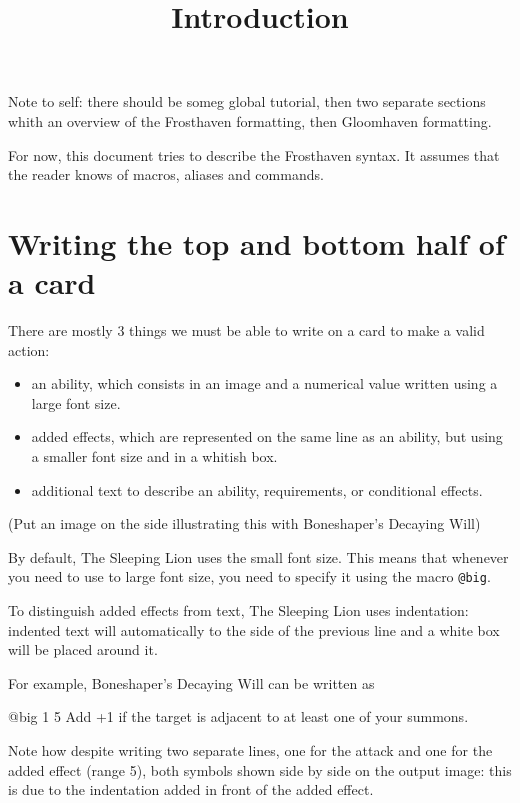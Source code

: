 \documentclass{article}
\title{Introduction}
\date{}
\begin{document}
\maketitle
\tableofcontents


Note to self: there should be someg global tutorial, then two separate sections whith an overview of the Frosthaven formatting, then Gloomhaven formatting.

For now, this document tries to describe the Frosthaven syntax. It assumes that the reader knows of macros, aliases and commands.

\section{Writing the top and bottom half of a card}
There are mostly 3 things we must be able to write on a card to make a valid action:
\begin{itemize}
\item an ability, which consists in an image and a numerical value written using a large font size.
\item added effects, which are represented on the same line as an ability, but using a smaller font size and in a whitish box.
\item additional text to describe an ability, requirements, or conditional effects. 
\end{itemize}

(Put an image on the side illustrating this with Boneshaper's Decaying Will)

By default, The Sleeping Lion uses the small font size. This means that whenever you need to use to large font size, you need to specify it using the macro \verb'@big'. 

To distinguish added effects from text, The Sleeping Lion uses indentation: indented text will automatically to the side of the previous line and a white box will be placed around it.

For example, Boneshaper's Decaying Will can be written as
\begin{spverbatim}
	@big  1
    		 5
	Add +1  if the target is adjacent to at least one of your summons.
\end{spverbatim}
Note how despite writing two separate lines, one for the attack and one for the added effect (range 5), both symbols shown side by side on the output image: this is due to the indentation added in front of the added effect.
\end{document}
